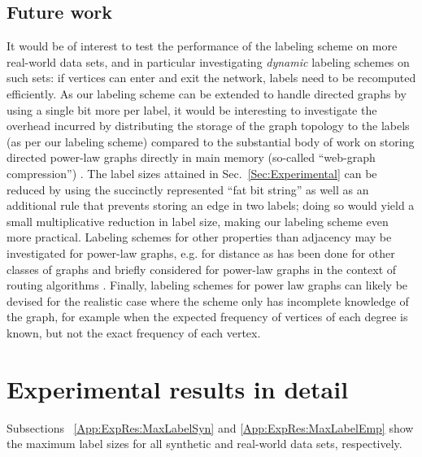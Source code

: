 \documentclass{article}
\theoremstyle{remark}
\begin{document}
\subsection{Future work}

It would be of interest to test the performance of the labeling scheme on more real-world data sets, and in particular investigating \emph{dynamic} labeling schemes on such sets: if vertices can enter and exit the network, labels need to be recomputed efficiently.
As our labeling scheme can be extended to handle directed graphs by using a single bit more per label, it would be interesting to investigate the overhead incurred by distributing the storage of the graph topology to the labels (as per our labeling scheme) compared to the substantial body of work on storing directed power-law graphs directly in main memory (so-called ``web-graph compression'') \cite{guillaume2002efficient,asano2003compact, asano2008efficient,claude2010fast}.
The  label sizes attained in Sec.~\ref{Sec:Experimental} can be reduced by using the succinctly represented ``fat bit string'' as well as an additional rule that prevents storing  an edge in two  labels; doing so would yield a small multiplicative reduction in label size, making our labeling scheme even more practical. 
Labeling schemes for other properties than adjacency may be investigated for power-law graphs, e.g. for distance as has been done for other classes of graphs \cite{alstrup2005labeling}
and briefly considered for power-law graphs in the context of routing algorithms \cite{chen2012compact}.
Finally, labeling schemes for power law graphs can likely be devised for the realistic case where the scheme only has incomplete knowledge of the graph, for example when the expected frequency of vertices of each degree is known, but not the exact frequency of each vertex.\newpage
 

\newpage
\appendix
\section{Experimental results in detail}\label{App:ExpRes}
Subsections ~\ref{App:ExpRes:MaxLabelSyn} and \ref{App:ExpRes:MaxLabelEmp}  show the maximum label sizes for all synthetic and real-world data sets, respectively.
\end{document}
